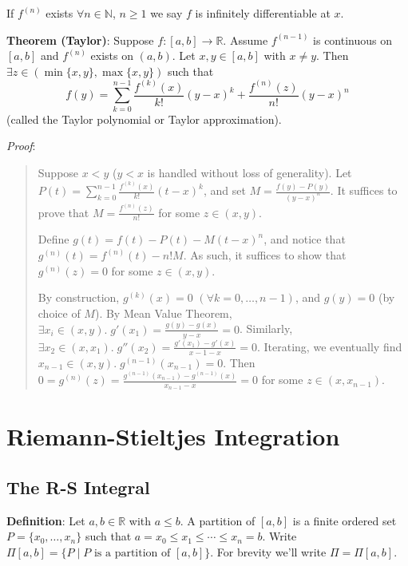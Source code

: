 \documentclass[11pt]{article}
\begin{document}
If $f^{(n)}$ exists $\forall n \in \mathbb{N}$, $n \geq 1$ we say $f$ is infinitely differentiable at $x$.

\textbf{Theorem (Taylor)}: Suppose $f : [a,b] \to \mathbb{R}$. Assume $f^{(n-1)}$ is continuous on $[a,b]$ and $f^(n)$ exists on $(a,b)$. Let $x,y \in [a,b]$ with $x \neq y$. Then $\exists z \in (\min\{x,y\}, \max\{x,y\})$ such that
\begin{displaymath}
f(y) = \sum_{k=0}^{n-1} \frac{f^{(k)}(x)}{k!} (y-x)^k + \frac{f^{(n)}(z)}{n!} (y-x)^n
\end{displaymath}
(called the Taylor polynomial or Taylor approximation).

\emph{Proof}:
\begin{quote}\vspace{-0.3cm}
Suppose $x < y$ ($y < x$ is handled without loss of generality). Let $P(t) = \sum_{k=0}^{n-1} \frac{f^{(k)}(x)}{k!} (t-x)^k$, and set $M = \frac{f(y) - P(y)}{(y-x)^n}$. It suffices to prove that $M = \frac{f^{(n)}(z)}{n!}$ for some $z \in (x,y)$.

Define $g(t) = f(t) - P(t) - M(t-x)^n$, and notice that $g^{(n)}(t) = f^{(n)}(t) - n!M$. As such, it suffices to show that $g^{(n)}(z) = 0$ for some $z \in (x,y)$.

By construction, $g^{(k)}(x) = 0$ $(\forall k = 0, \ldots, n-1)$, and $g(y) = 0$ (by choice of $M$). By Mean Value Theorem, $\exists x_i \in (x,y).\; g'(x_1) = \frac{g(y) - g(x)}{y-x} = 0$. Similarly, $\exists x_2 \in (x, x_1).\; g''(x_2) = \frac{g'(x_1) - g'(x)}{x-1 - x} = 0$. Iterating, we eventually find $x_{n-1} \in (x,y).\; g^{(n-1)}(x_{n-1}) = 0$. Then $0 = g^{(n)}(z) = \frac{g^{(n-1)}(x_{n-1}) - g^{(n-1)}(x)}{x_{n-1} - x} = 0$ for some $z \in (x, x_{n-1})$.
\end{quote}

\section{Riemann-Stieltjes Integration}

\subsection{The R-S Integral}

\textbf{Definition}: Let $a,b \in \mathbb{R}$ with $a \leq b$. A partition of $[a,b]$ is a finite ordered set $P = \{x_0, \ldots, x_n\}$ such that $a = x_0 \leq x_1 \leq \cdots \leq x_n = b$. Write $\Pi[a,b] = \{P \mid P \text{ is a partition of }[a,b]\}$. For brevity we'll write $\Pi = \Pi[a,b]$.
\end{document}
